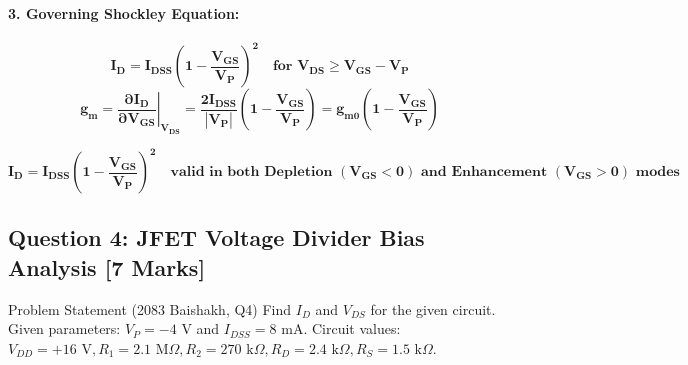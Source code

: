 \documentclass[11pt,a4paper,oneside]{book}
\begin{document}
\paragraph{3. Governing Shockley Equation:}
\[
\mathbf{I_D = I_{DSS}\left(1 - \frac{V_{GS}}{V_P}\right)^2 \quad \text{for } V_{DS} \ge V_{GS} - V_P}
\]
\[
\mathbf{g_m = \left.\frac{\partial I_D}{\partial V_{GS}}\right|_{V_{DS}} = \frac{2I_{DSS}}{|V_P|}\left(1 - \frac{V_{GS}}{V_P}\right) = g_{m0}\left(1 - \frac{V_{GS}}{V_P}\right)}
\]

\begin{answerbox}
$$\mathbf{I_D = I_{DSS}\left(1 - \frac{V_{GS}}{V_P}\right)^2 \quad \text{valid in both Depletion } (V_{GS}<0) \text{ and Enhancement } (V_{GS}>0) \text{ modes}}$$
\end{answerbox}

\vspace{0.6cm}

\subsection{Question 4: JFET Voltage Divider Bias Analysis [7 Marks]}
\begin{questionbox}{Problem Statement (2083 Baishakh, Q4)}
Find $I_D$ and $V_{DS}$ for the given circuit. Given parameters: $V_P = -4\text{ V}$ and $I_{DSS} = 8\text{ mA}$.
Circuit values: $V_{DD} = +16\text{ V}, R_1 = 2.1\text{ M}\Omega, R_2 = 270\text{ k}\Omega, R_D = 2.4\text{ k}\Omega, R_S = 1.5\text{ k}\Omega$.
\end{questionbox}
\end{document}
